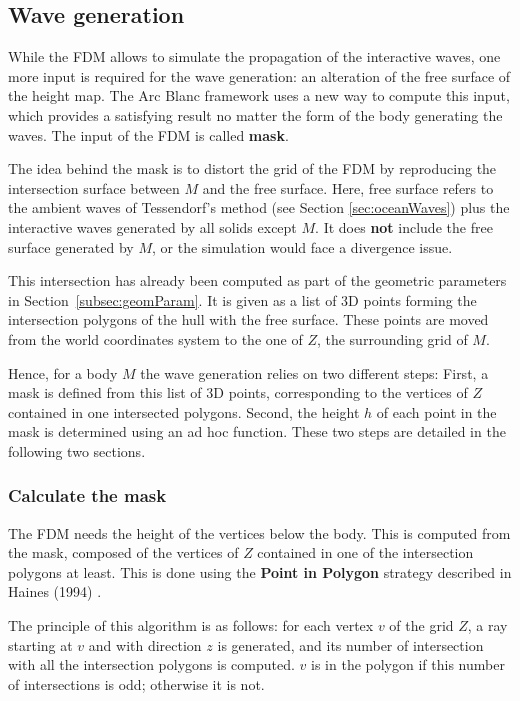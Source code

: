 \documentclass[final]{jcgt}
\def\Framework{The Arc Blanc framework\xspace}
\begin{document}
\subsection{Wave generation}
\label{subsec:mask}
While the FDM allows to simulate the propagation of the interactive waves, one more input is required for the wave generation: an alteration of the free surface of the height map.
\Framework uses a new way to compute this input, which provides a satisfying result no matter the form of the body generating the waves.
The input of the FDM is called \textbf{mask}.

The idea behind the mask is to distort the grid of the FDM by reproducing the intersection surface between $M$ and the free surface.
Here, free surface refers to the ambient waves of Tessendorf's method (see Section \ref{sec:oceanWaves}) plus the interactive waves generated by all solids except $M$.
It does \textbf{not} include the free surface generated by $M$, or the simulation would face a divergence issue.

This intersection has already been computed as part of the geometric parameters in Section~\ref{subsec:geomParam}.
It is given as a list of 3D points forming the intersection polygons of the hull with the free surface.
These points are moved from the world coordinates system to the one of $Z$, the surrounding grid of $M$.

Hence, for a body $M$ the wave generation relies on two different steps:
First, a mask is defined from this list of 3D points, corresponding to the vertices of $Z$ contained in one intersected polygons.
Second, the height $h$ of each point in the mask is determined using an ad hoc function.
These two steps are detailed in the following two sections.

\subsubsection{Calculate the mask}
The FDM needs the height of the vertices below the body.
This is computed from the mask, composed of the vertices of $Z$ contained in one of the intersection polygons at least.
This is done using the \textbf{Point in Polygon} strategy described in Haines (1994) \cite{hainesPointPolygonStrategies1994}.

The principle of this algorithm is as follows:
for each vertex $v$ of the grid $Z$, a ray starting at $v$ and with direction $z$ is generated, and its number of intersection with all the intersection polygons is computed.
$v$ is in the polygon if this number of intersections is odd; otherwise it is not.
\end{document}
